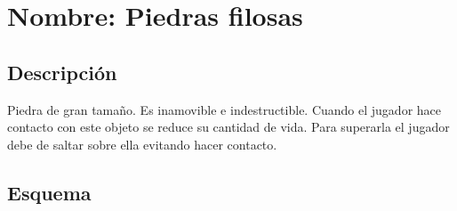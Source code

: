 		\section{Nombre: Piedras filosas}\label{obs.piedrasF}
	\subsection{Descripción}
	Piedra de gran tamaño. Es inamovible e indestructible. Cuando el jugador hace contacto con este objeto se reduce su cantidad de vida. Para superarla el jugador debe de saltar sobre ella evitando hacer contacto.
	\subsection{Esquema}
